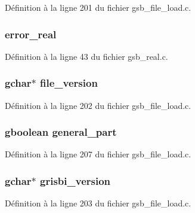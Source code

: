Définition à la ligne 201 du fichier gsb\_\-file\_\-load.c.

\subsubsection[{error\_\-real}]{ {\bf error\_\-real}}\label{gsb__file__load_8c_a520cf94ffbcb7bc947e1cb63cda4af06}


Définition à la ligne 43 du fichier gsb\_\-real.c.

\subsubsection[{file\_\-version}]{\setlength{\rightskip}{0pt plus 5cm}gchar$\ast$ {\bf file\_\-version}}\label{gsb__file__load_8c_a799f5f69ef6ebdfe63547e7bdbbbfb7f}


Définition à la ligne 202 du fichier gsb\_\-file\_\-load.c.

\subsubsection[{general\_\-part}]{\setlength{\rightskip}{0pt plus 5cm}gboolean {\bf general\_\-part}}\label{gsb__file__load_8c_ab34360bda14f29e99791e67f236b7d91}


Définition à la ligne 207 du fichier gsb\_\-file\_\-load.c.

\subsubsection[{grisbi\_\-version}]{\setlength{\rightskip}{0pt plus 5cm}gchar$\ast$ {\bf grisbi\_\-version}}\label{gsb__file__load_8c_ad3e56334c6103b3e5e3cc2ba40384a07}


Définition à la ligne 203 du fichier gsb\_\-file\_\-load.c.

